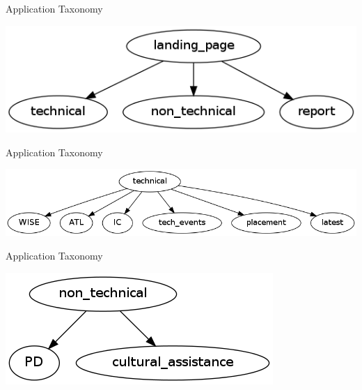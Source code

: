 \documentclass[14pt]{beamer}
\begin{document}
\begin{frame}{Application Taxonomy}

	\begin{center}

	\includegraphics[scale = 0.45]{spin.png}

	\end{center}

\end{frame}


\begin{frame}{Application Taxonomy}

	\begin{center}

	\includegraphics[scale = 0.38]{tech.png}

	\end{center}

\end{frame}


\begin{frame}{Application Taxonomy}

	\begin{center}

	\includegraphics[scale = 0.5]{nontech.png}

	\end{center}

\end{frame}
\end{document}
